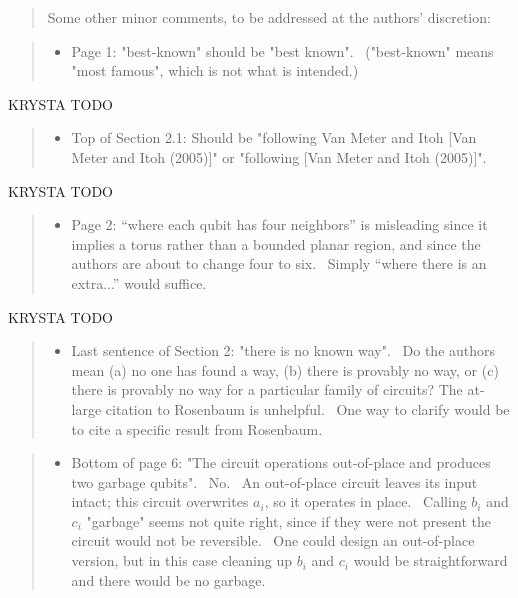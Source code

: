 \documentclass{article}
\theoremstyle{plain} \newtheorem{lemma}{Lemma}
\begin{document}
\begin{quote}
Some other minor comments, to be addressed at the authors' discretion: 
\end{quote}

\begin{quote}
\begin{itemize}
\item Page 1: "best-known" should be "best known".  ("best-known" means 
"most famous", which is not what is intended.) 
\end{itemize}
\end{quote}

KRYSTA TODO

\begin{quote}
\begin{itemize}
\item
Top of Section 2.1: Should be "following Van Meter and Itoh [Van Meter 
and Itoh (2005)]" or "following [Van Meter and Itoh (2005)]". 
\end{itemize}
\end{quote}

KRYSTA TODO

\begin{quote}
\begin{itemize}
\item
Page 2: ``where each qubit has four neighbors'' is misleading since it 
implies a torus rather than a bounded planar region, and since the authors 
are about to change four to six.  Simply ``where there is an extra...''
would suffice.
\end{itemize}
\end{quote}

KRYSTA TODO

\begin{quote}
\begin{itemize}
\item
Last sentence of Section 2: "there is no known way".  Do the authors 
mean (a) no one has found a way, (b) there is provably no way, or 
(c) there is provably no way for a particular family of circuits? The 
at-large citation to Rosenbaum is unhelpful.  One way to clarify would be 
to cite a specific result from Rosenbaum. 
\end{itemize}
\end{quote}

\begin{quote}
\begin{itemize}
\item
Bottom of page 6: "The circuit operations out-of-place and produces 
two garbage qubits".  No.  An out-of-place circuit leaves its input intact; 
this circuit overwrites $a_i$, so it operates in place.  Calling $b_i$ and 
$c_i$ "garbage" seems not quite right, since if they were not present the 
circuit would not be reversible.  One could design an out-of-place version, 
but in this case cleaning up $b_i$ and $c_i$ would be straightforward and 
there would be no garbage. 
\end{itemize}
\end{quote}
\end{document}
